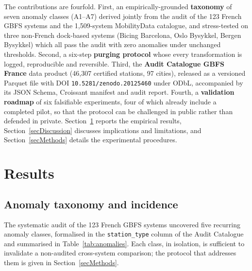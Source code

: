 \documentclass[11pt,a4paper]{article}
\begin{document}
The contributions are fourfold. First, an empirically-grounded
\textbf{taxonomy} of seven anomaly classes (A1--A7) derived
jointly from the audit of the 123 French GBFS systems and the
1{,}509-system MobilityData catalogue, and stress-tested on
three non-French dock-based systems (Bicing Barcelona, Oslo
Bysykkel, Bergen Bysykkel) which all pass the audit with zero
anomalies under unchanged thresholds. Second, a
six-step \textbf{purging protocol} whose every transformation is
logged, reproducible and reversible. Third, the \textbf{Audit Catalogue
GBFS France} data product (46{,}307 certified stations, 97 cities),
released as a versioned Parquet file with DOI
\texttt{10.5281/zenodo.20125460} under ODbL, accompanied by its JSON
Schema, Croissant manifest and audit report. Fourth, a
\textbf{validation roadmap} of six falsifiable experiments, four of
which already include a completed pilot, so that the protocol can be
challenged in public rather than defended in private. Section~\ref{secResults} reports the empirical results,
Section~\ref{secDiscussion} discusses implications and limitations, and
Section~\ref{secMethods} details the experimental procedures.

\section{Results}\label{secResults}

\subsection{Anomaly taxonomy and incidence}
The systematic audit of the 123 French GBFS systems uncovered five
recurring anomaly classes, formalised in the \texttt{station\_type}
column of the Audit Catalogue and summarised in
Table~\ref{tab:anomalies}. Each class, in isolation, is sufficient to
invalidate a non-audited cross-system comparison; the protocol that
addresses them is given in Section~\ref{secMethods}.
\end{document}
